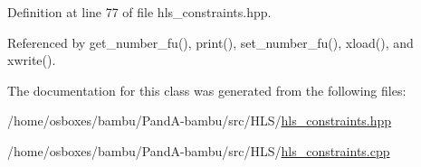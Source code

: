 Definition at line 77 of file hls\+\_\+constraints.\+hpp.



Referenced by get\+\_\+number\+\_\+fu(), print(), set\+\_\+number\+\_\+fu(), xload(), and xwrite().



The documentation for this class was generated from the following files\+:\begin{DoxyCompactItemize}
\item 
/home/osboxes/bambu/\+Pand\+A-\/bambu/src/\+H\+L\+S/\hyperlink{hls__constraints_8hpp}{hls\+\_\+constraints.\+hpp}\item 
/home/osboxes/bambu/\+Pand\+A-\/bambu/src/\+H\+L\+S/\hyperlink{hls__constraints_8cpp}{hls\+\_\+constraints.\+cpp}\end{DoxyCompactItemize}
